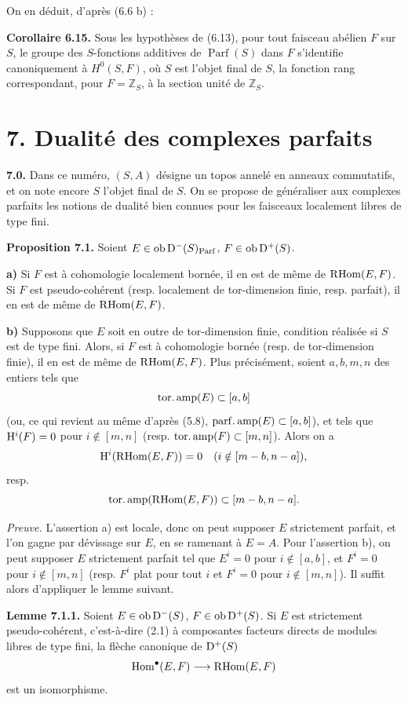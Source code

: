 \documentclass[11pt]{article}
\newcommand{\Parf}{\operatorname{Parf}}
\begin{document}
On en déduit, d'après (6.6 b) :

\textbf{Corollaire 6.15.} Sous les hypothèses de (6.13), pour tout faisceau abélien \(F\) sur \(S\), le groupe des \(S\)-fonctions additives de \(\Parf(S)\) dans \(F\) s'identifie canoniquement à \(H^0(S,F)\), où \(S\) est l'objet final de \(S\), la fonction rang correspondant, pour \(F=\mathbb Z_S\), à la section unité de \(\mathbb Z_S\).

\section*{7. Dualité des complexes parfaits}

\textbf{7.0.} Dans ce numéro, \((S,A)\) désigne un topos annelé en anneaux commutatifs, et on note encore \(S\) l'objet final de \(S\). On se propose de généraliser aux complexes parfaits les notions de dualité bien connues pour les faisceaux localement libres de type fini.

\textbf{Proposition 7.1.} Soient \(E\in\Ob\Dpx^-(S)_{\Parf}\), \(F\in\operatorname{ob}\mathrm D^+(S)\).

\textbf{a)} Si \(F\) est à cohomologie localement bornée, il en est de même de \(\mathrm R\!\operatorname{Hom}(E,F)\). Si \(F\) est pseudo-cohérent (resp. localement de tor-dimension finie, resp. parfait), il en est de même de \(\mathrm R\!\operatorname{Hom}(E,F)\).

\textbf{b)} Supposons que \(E\) soit en outre de tor-dimension finie, condition réalisée si \(S\) est de type fini. Alors, si \(F\) est à cohomologie bornée (resp. de tor-dimension finie), il en est de même de \(\mathrm R\!\operatorname{Hom}(E,F)\). Plus précisément, soient \(a,b,m,n\) des entiers tels que
\[
  \operatorname{tor.amp}(E)\subset[a,b]
\]
(ou, ce qui revient au même d'après (5.8), \(\operatorname{parf.amp}(E)\subset[a,b]\)), et tels que \(\mathrm H^i(F)=0\) pour \(i\notin[m,n]\) (resp. \(\operatorname{tor.amp}(F)\subset[m,n]\)). Alors on a
\[
  \mathrm H^i(\mathrm R\!\operatorname{Hom}(E,F))=0\quad(i\notin[m-b,n-a]),
\]
resp.
\[
  \operatorname{tor.amp}(\mathrm R\!\operatorname{Hom}(E,F))\subset[m-b,n-a].
\]

\emph{Preuve.} L'assertion a) est locale, donc on peut supposer \(E\) strictement parfait, et l'on gagne par dévissage sur \(E\), en se ramenant à \(E=A\). Pour l'assertion b), on peut supposer \(E\) strictement parfait tel que \(E^i=0\) pour \(i\notin[a,b]\), et \(F^i=0\) pour \(i\notin[m,n]\) (resp. \(F^i\) plat pour tout \(i\) et \(F^i=0\) pour \(i\notin[m,n]\)). Il suffit alors d'appliquer le lemme suivant.

\textbf{Lemme 7.1.1.} Soient \(E\in\operatorname{ob}\mathrm D^-(S)\), \(F\in\operatorname{ob}\mathrm D^+(S)\). Si \(E\) est strictement pseudo-cohérent, c'est-à-dire (2.1) à composantes facteurs directs de modules libres de type fini, la flèche canonique de \(\mathrm D^+(S)\)
\[
  \operatorname{Hom}^\bullet(E,F)\longrightarrow\mathrm R\!\operatorname{Hom}(E,F)
\]
est un isomorphisme.
\end{document}
